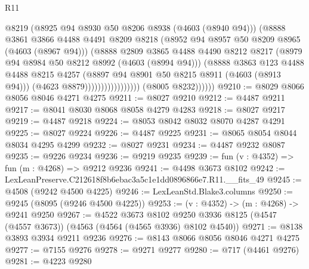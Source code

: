 \begin{lexlean}{R11}
\begin{coremodule}
                                        @8219
                                        (@8925 @94 @8930 @50 @8206 @8938 (@4603 (@8940 @94)))
                                        (@8888
                                          @3861
                                          @3866
                                          @4488
                                          @4491
                                          @8209
                                          @8218
                                          (@8952 @94 @8957 @50 @8209 @8965 (@4603 (@8967 @94)))
                                          (@8888
                                            @2809
                                            @3865
                                            @4488
                                            @4490
                                            @8212
                                            @8217
                                            (@8979 @94 @8984 @50 @8212 @8992 (@4603 (@8994 @94)))
                                            (@8888
                                              @3863
                                              @123
                                              @4488
                                              @4488
                                              @8215
                                              @4257
                                              (@8897 @94 @8901 @50 @8215 @8911 (@4603 (@8913 @94)))
                                              (@4623 @8879)))))))))))))))))
              (@8005 @8232))))))
@9210 := @8029 @8066 @8056 @8046 @4271 @4275
@9211 := @8027 @9210
@9212 := @4487 @9211
@9217 := @8041 @8030 @8068 @8058 @4279 @4283
@9218 := @8027 @9217
@9219 := @4487 @9218
@9224 := @8053 @8042 @8032 @8070 @4287 @4291
@9225 := @8027 @9224
@9226 := @4487 @9225
@9231 := @8065 @8054 @8044 @8034 @4295 @4299
@9232 := @8027 @9231
@9234 := @4487 @9232 @8087
@9235 := @9226 @9234
@9236 := @9219 @9235
@9239 := fun (v : @4352) => fun (m : @4268) => @9212 @9236
@9241 := @4498 @3673 @8102
@9242 := LexLeanPreserve.C212618f8b6ebac3a5c1e1dd0896866e7.R11.__fits_49
@9245 := @4508 (@9242 @4500 @4225)
@9246 := LexLeanStd.Blake3.columns
@9250 := @9245 (@8095 (@9246 @4500 @4225))
@9253 := (v : @4352) -> (m : @4268) -> @9241 @9250
@9267 := @4522
    @3673
    @8102
    @9250
    @3936
    @8125
    (@4547 (@4557 @3673))
    (@4563 (@4564 (@4565 @3936) @8102 @4540))
@9271 := @8138 @3893 @3934 @9211 @9236
@9276 := @8143 @8066 @8056 @8046 @4271 @4275
@9277 := @7155 @9276
@9278 := @9271 @9277
@9280 := @717 (@4461 @9276)
@9281 := @4223 @9280

\end{coremodule}
\end{lexlean}
